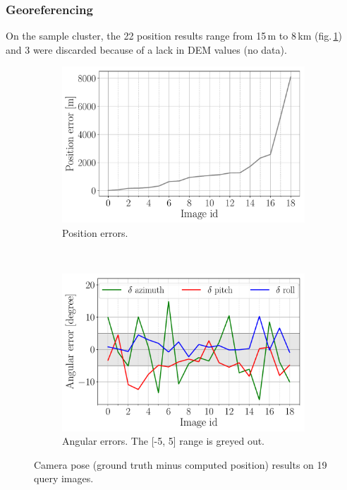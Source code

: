 \documentclass[fleqn,10pt]{wlpeerj} %
\begin{document}
\subsubsection*{Georeferencing}
On the sample cluster, the 22 position results range from 15\,m to 8\,km (fig.\,\ref{pose:1}) and 3
were discarded because of a lack in DEM values (no data).



\begin{figure}[H]
\centering
\begin{subfigure}{0.48\linewidth}
    \includegraphics[width=1\linewidth]{pos.pdf}
    \caption{Position errors.}
    \label{pose:1}
\end{subfigure}
~
\begin{subfigure}{0.48\linewidth}
    \includegraphics[width=1\linewidth]{angles.pdf}
    \caption{Angular errors. The [-5, 5] range is greyed out.}
    \label{pose:2}
\end{subfigure}
\caption{Camera pose (ground truth minus computed position) results on 19 query images.}
\label{pose}
\end{figure}
\end{document}
